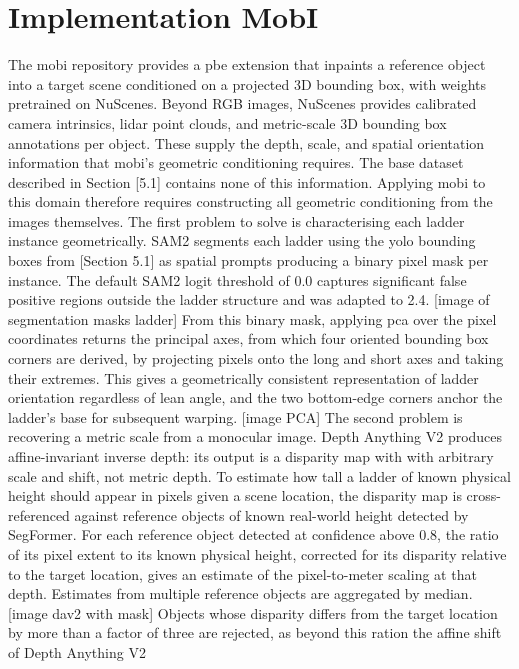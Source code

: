 \section{Implementation MobI}
The \gls{mobi}\cite{mobi} repository provides a \gls{pbe}\cite{pbe} extension that inpaints a reference object 
into a target scene conditioned on a projected 3D bounding box, with weights pretrained on NuScenes\cite{nuscene}. 
Beyond RGB images, NuScenes provides calibrated camera intrinsics, \gls{lidar} point clouds, and metric-scale 3D bounding box annotations per object. 
These supply the depth, scale, and spatial orientation information that \gls{mobi}'s geometric conditioning requires. 
The base dataset described in Section [5.1] contains none of this information.
Applying \gls{mobi} to this domain therefore requires constructing all geometric conditioning from the images themselves. 
The first problem to solve is characterising each ladder instance geometrically. SAM2\cite{sam2} segments each ladder using the \gls{yolo} bounding boxes 
from [Section 5.1] as spatial prompts producing a binary pixel mask per instance. The default SAM2\cite{sam2} logit threshold of 0.0 captures significant 
false positive regions outside the ladder structure and was adapted to 2.4. 
[image of segmentation masks ladder]
From this binary mask, applying \gls{pca} over the pixel coordinates returns the principal axes, 
from which four oriented bounding box corners are derived, by projecting pixels onto the long and short axes and taking their extremes. 
This gives a geometrically consistent representation of ladder orientation regardless of lean angle, and the two bottom-edge corners anchor 
the ladder's base for subsequent warping. 
[image PCA]
The second problem is recovering a metric scale from a monocular image. Depth Anything V2\cite{depthanything2} produces affine-invariant inverse depth: 
its output is a disparity map with with arbitrary scale and shift, not metric depth. To estimate how tall a ladder of known physical height should appear 
in pixels given a scene location, the disparity map is cross-referenced against reference objects of known real-world height detected by SegFormer\cite{segformer}.
For each reference object detected at confidence above 0.8, the ratio of its pixel extent to its known physical height, corrected for its disparity relative 
to the target location, gives an estimate of the pixel-to-meter scaling at that depth. Estimates from multiple reference objects are aggregated by median. 
[image dav2 with mask]
Objects whose disparity differs from the target location by more than a factor of three are rejected, as beyond this ration the affine shift of Depth Anything V2\cite{depthanything2}
